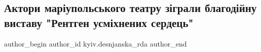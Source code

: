  
 
 
 
 

\subsection{Актори маріупольського театру зіграли благодійну виставу "Рентген усміхнених сердець"}
\label{sec:17_03_2023.fb.kyiv.desnjanska_rda.1.mariupol_teatr_rentgen_serdec}

\ifcmt
 author_begin
   author_id kyiv.desnjanska_rda
 author_end
\fi
